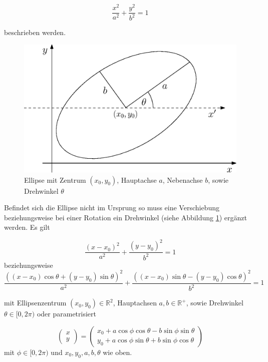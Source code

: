 \begin{equation} \label{eq:ellipseNoRotNoTrans}
\frac{x^2}{a^2} + \frac{y^2}{b^2} = 1
\end{equation} 

beschrieben werden.

\begin{figure}[!htb]
	\centering
	\includegraphics[scale=.7]{images/ellipse.eps}
	\caption{Ellipse mit Zentrum $(x_0, y_0)$, Hauptachse $a$, Nebenachse $b$, sowie Drehwinkel $\theta$}
	\label{fig:ellipse}
\end{figure}

Befindet sich die Ellipse nicht im Ursprung so muss eine Verschiebung beziehungsweise bei einer Rotation ein Drehwinkel (siehe Abbildung \ref{fig:ellipse}) ergänzt werden. Es gilt

\begin{equation} \label{eq:ellipseNoRotTrans}
\frac{\left(x-x_0\right)^2}{a^2} + \frac{\left(y-y_0\right)^2}{b^2} = 1
\end{equation} 
beziehungsweise
\begin{equation} \label{eq:ellipseRotTrans}
\frac{((x - x_0)\cos\theta + (y - y_0)\sin\theta)^2}{a^2} + \frac{((x - x_0)\sin\theta - (y - y_0)\cos\theta)^2}{b^2} = 1
\end{equation} 

mit Ellipsenzentrum $(x_0,y_0)\in\mathbb{R}^2$, Hauptachsen $a,b\in\mathbb{R}^+$, sowie Drehwinkel $\theta \in [0,2\pi)$ oder parametrisiert

\begin{equation} \label{eq:ellipseRotTransParam}
\begin{pmatrix}x \\ y\end{pmatrix} = \begin{pmatrix}x_0 + a\cos\phi\cos\theta - b\sin\phi\sin\theta \\ 
y_0 + a\cos\phi\sin\theta + b\sin\phi\cos\theta\end{pmatrix}
\end{equation}
mit $\phi \in [0, 2\pi)$ und $x_0, y_0, a,b, \theta$ wie oben.

